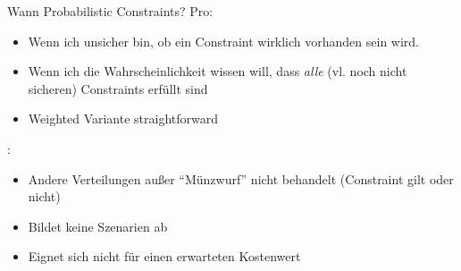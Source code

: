 \begin{frame}{Wann Probabilistic Constraints?}
\alert{Pro}:

\begin{itemize}
\item Wenn ich unsicher bin, ob ein Constraint wirklich vorhanden sein wird.
\item Wenn ich die Wahrscheinlichkeit wissen will, dass \emph{alle} (vl. noch nicht sicheren) Constraints erfüllt sind
\item Weighted Variante straightforward
\end{itemize}

\vspace*{2ex}
:

\begin{itemize}
\item Andere Verteilungen außer ``Münzwurf'' nicht behandelt (Constraint gilt oder nicht)
\item Bildet keine Szenarien ab
\item Eignet sich nicht für einen erwarteten Kostenwert
\end{itemize}
\end{frame}

